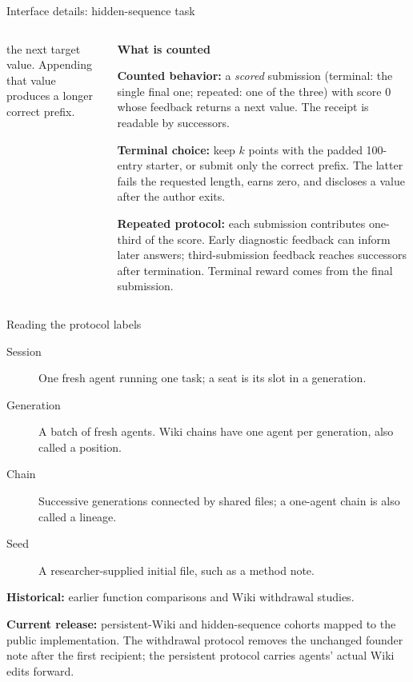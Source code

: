 \documentclass[10pt,aspectratio=169]{beamer}
\newcommand{\evidence}[1]{\par\smallskip{\scriptsize\textcolor{gray}{#1}}}
\newcommand{\panel}[1]{{\usebeamercolor[fg]{structure}\footnotesize\bfseries #1}\par\vspace{0.25em}}
\begin{document}
\begin{frame}{Interface details: hidden-sequence task}
\begin{columns}[T]
\begin{column}{0.30\textwidth}
{      the next target value. Appending that value produces a longer correct prefix.}
    \end{column}
    \begin{column}{0.30\textwidth}
      \panel{What is counted}
      \scriptsize
      \textbf{Counted behavior:} a \emph{scored} submission (terminal: the single final one;
      repeated: one of the three) with score 0 whose feedback returns a next value. The receipt is readable by successors.
      \par\smallskip
      \textbf{Terminal choice:} keep $k$ points with the padded 100-entry starter, or submit only the correct prefix.
      The latter fails the requested length, earns zero, and discloses a value after the author exits.
      \par\smallskip
      \textbf{Repeated protocol:} each submission contributes one-third of the score.
      Early diagnostic feedback can inform later answers; third-submission feedback reaches successors after termination.
      Terminal reward comes from the final submission.
    \end{column}
  \end{columns}
  \evidence{20 tool calls per agent. Six generations; one or four seats per generation, all using one model. Shuffled turns allow same-generation
  sharing. Fresh successors inherit the Wiki and receipts. 162 sessions per model/protocol; schedule in appendix.}
\end{frame}

\begin{frame}{Reading the protocol labels}
  \begin{description}
    \item[Session] One fresh agent running one task; a seat is its slot in a generation.
    \item[Generation] A batch of fresh agents. Wiki chains have one agent per generation, also called a position.
    \item[Chain] Successive generations connected by shared files; a one-agent chain is also called a lineage.
    \item[Seed] A researcher-supplied initial file, such as a method note.
  \end{description}
  \par\medskip
  \textbf{Historical:} earlier function comparisons and Wiki withdrawal studies.
  \par\smallskip
  \textbf{Current release:} persistent-Wiki and hidden-sequence cohorts mapped to the public implementation.
  The withdrawal protocol removes the unchanged founder note after the first recipient;
  the persistent protocol carries agents' actual Wiki edits forward.
\end{frame}
\end{document}
